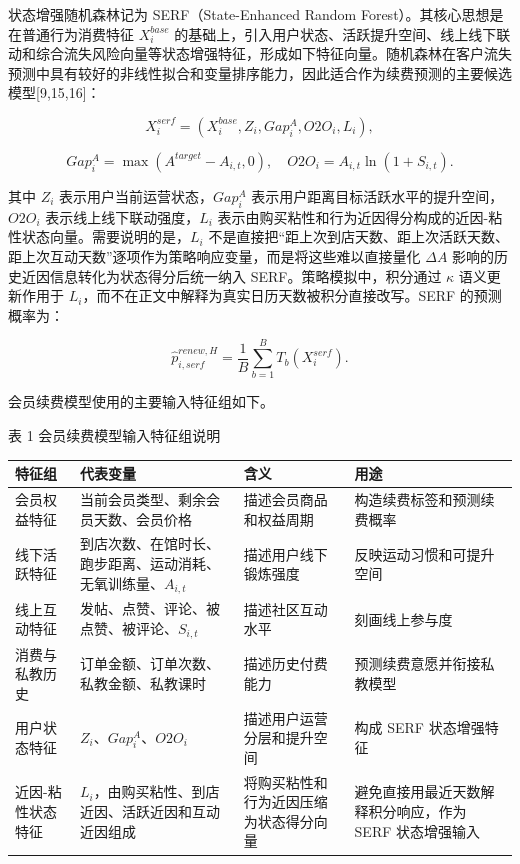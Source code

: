\documentclass[
  12pt,
]{ctexart}
\begin{document}
状态增强随机森林记为 SERF（State-Enhanced Random Forest）。其核心思想是在普通行为消费特征 \(X_i^{base}\) 的基础上，引入用户状态、活跃提升空间、线上线下联动和综合流失风险向量等状态增强特征，形成如下特征向量。随机森林在客户流失预测中具有较好的非线性拟合和变量排序能力，因此适合作为续费预测的主要候选模型{[}9,15,16{]}：

\[
X_i^{serf}=\left(X_i^{base},Z_i,Gap_i^{A},O2O_i,L_i\right),
\tag{14}
\]

\[
Gap_i^{A}=\max(A^{target}-A_{i,t},0),\quad O2O_i=A_{i,t}\ln(1+S_{i,t}).
\tag{15}
\]

其中 \(Z_i\) 表示用户当前运营状态，\(Gap_i^{A}\) 表示用户距离目标活跃水平的提升空间，\(O2O_i\) 表示线上线下联动强度，\(L_i\) 表示由购买粘性和行为近因得分构成的近因-粘性状态向量。需要说明的是，\(L_i\) 不是直接把``距上次到店天数、距上次活跃天数、距上次互动天数''逐项作为策略响应变量，而是将这些难以直接量化 \(\Delta A\) 影响的历史近因信息转化为状态得分后统一纳入 SERF。策略模拟中，积分通过 \(\kappa\) 语义更新作用于 \(L_i\)，而不在正文中解释为真实日历天数被积分直接改写。SERF 的预测概率为：

\[
\hat p_{i,serf}^{renew,H}=\frac{1}{B}\sum_{b=1}^{B}T_b(X_i^{serf}).
\tag{16}
\]

会员续费模型使用的主要输入特征组如下。

\begin{center}\small 表 1 会员续费模型输入特征组说明\end{center}

\begingroup
\small
\setlength{\tabcolsep}{2pt}
\begin{longtable}[]{@{}
  >{\raggedright\arraybackslash}p{2.8cm}
  >{\raggedright\arraybackslash}p{4.8cm}
  >{\raggedright\arraybackslash}p{3.5cm}
  >{\raggedright\arraybackslash}p{4.0cm}@{}}
\toprule
特征组 & 代表变量 & 含义 & 用途 \\
\midrule
\endhead
会员权益特征 & 当前会员类型、剩余会员天数、会员价格 & 描述会员商品和权益周期 & 构造续费标签和预测续费概率 \\
线下活跃特征 & 到店次数、在馆时长、跑步距离、运动消耗、无氧训练量、\(A_{i,t}\) & 描述用户线下锻炼强度 & 反映运动习惯和可提升空间 \\
线上互动特征 & 发帖、点赞、评论、被点赞、被评论、\(S_{i,t}\) & 描述社区互动水平 & 刻画线上参与度 \\
消费与私教历史 & 订单金额、订单次数、私教金额、私教课时 & 描述历史付费能力 & 预测续费意愿并衔接私教模型 \\
用户状态特征 & \(Z_i\)、\(Gap_i^A\)、\(O2O_i\) & 描述用户运营分层和提升空间 & 构成 SERF 状态增强特征 \\
近因-粘性状态特征 & \(L_i\)，由购买粘性、到店近因、活跃近因和互动近因组成 & 将购买粘性和行为近因压缩为状态得分向量 & 避免直接用最近天数解释积分响应，作为 SERF 状态增强输入 \\
\bottomrule
\end{longtable}
\endgroup
\end{document}
